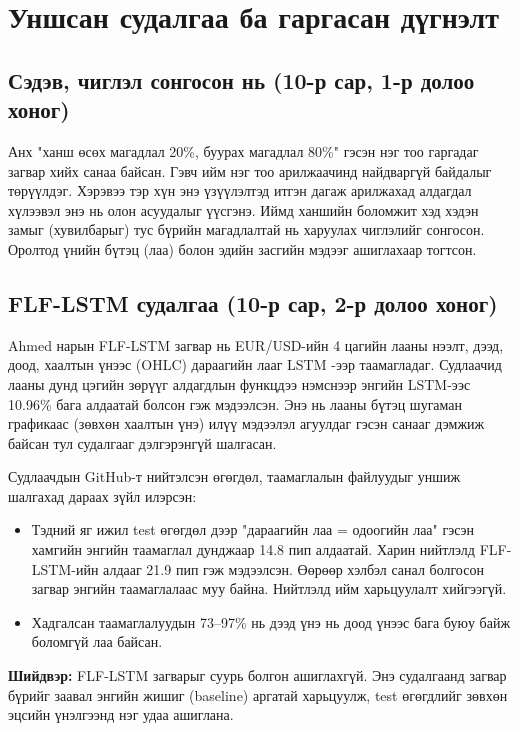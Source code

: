 \chapter{Уншсан судалгаа ба гаргасан дүгнэлт}
\label{ch:literature}

\section{Сэдэв, чиглэл сонгосон нь (10-р сар, 1-р долоо хоног)}
Анх "ханш өсөх магадлал 20\%, буурах магадлал 80\%" гэсэн нэг тоо гаргадаг загвар хийх санаа байсан. Гэвч ийм нэг тоо
арилжаачинд найдваргүй байдалыг төрүүлдэг. Хэрэвээ тэр хүн энэ үзүүлэлтэд итгэн дагаж арилжахад алдагдал хүлээвэл энэ нь олон асуудалыг үүсгэнэ. Иймд ханшийн боломжит хэд хэдэн замыг (хувилбарыг) тус бүрийн
магадлалтай нь харуулах чиглэлийг сонгосон. Оролтод үнийн бүтэц (лаа) болон эдийн засгийн мэдээг ашиглахаар тогтсон.

\section{FLF-LSTM судалгаа (10-р сар, 2-р долоо хоног)}
Ahmed нарын FLF-LSTM загвар \cite{ahmed2020flf} нь EUR/USD-ийн 4 цагийн лааны нээлт, дээд, доод, хаалтын үнээс
(OHLC) дараагийн лааг LSTM \cite{hochreiter1997lstm}-ээр таамагладаг. Судлаачид лааны дунд цэгийн зөрүүг алдагдлын
функцдээ нэмснээр энгийн LSTM-ээс 10.96\% бага алдаатай болсон гэж мэдээлсэн. Энэ нь лааны бүтэц шугаман графикаас
(зөвхөн хаалтын үнэ) илүү мэдээлэл агуулдаг гэсэн санааг дэмжиж байсан тул судалгааг дэлгэрэнгүй шалгасан.

Судлаачдын GitHub-т нийтэлсэн өгөгдөл, таамаглалын файлуудыг уншиж шалгахад дараах зүйл илэрсэн:
\begin{itemize}
    \item Тэдний яг ижил test өгөгдөл дээр "дараагийн лаа = одоогийн лаа" гэсэн хамгийн энгийн таамаглал дунджаар
          14.8 пип алдаатай. Харин нийтлэлд FLF-LSTM-ийн алдааг 21.9 пип гэж мэдээлсэн. Өөрөөр хэлбэл санал болгосон
          загвар энгийн таамаглалаас муу байна. Нийтлэлд ийм харьцуулалт хийгээгүй.
    \item Хадгалсан таамаглалуудын 73--97\% нь дээд үнэ нь доод үнээс бага буюу байж боломгүй лаа байсан.
\end{itemize}

\textbf{Шийдвэр:} FLF-LSTM загварыг суурь болгон ашиглахгүй. Энэ судалгаанд загвар бүрийг заавал энгийн жишиг
(baseline) аргатай харьцуулж, test өгөгдлийг зөвхөн эцсийн үнэлгээнд нэг удаа ашиглана.

